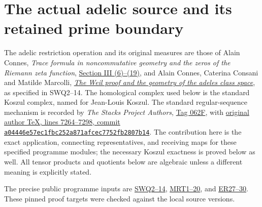 \section{The actual adelic source and its retained prime boundary}
\label{sec:independent-adelic-coinvariant-bridge}

The adelic restriction operation and its original measures are those of
Alain Connes, \emph{Trace formula in noncommutative geometry and the zeros
of the Riemann zeta function},
\href{https://arxiv.org/abs/math/9811068v1}{Section III (6)--(19)},
and Alain Connes, Caterina Consani and Matilde Marcolli,
\href{https://arxiv.org/abs/math/0703392v1}{\emph{The Weil proof and the
geometry of the adeles class space}}, as specified in SWQ2--14.
The homological complex used below is the standard Koszul complex,
named for Jean-Louis Koszul. The standard regular-sequence mechanism is
recorded by \emph{The Stacks Project Authors},
\href{https://stacks.math.columbia.edu/tag/062F}{Tag 062F}, with
\href{https://github.com/stacks/stacks-project/blob/a04446e57ec1fbc252a871afcec7752fb2807b14/more-algebra.tex#L7264}{original
author TeX, lines 7264--7298, commit
\texttt{a04446e57ec1fbc252a871afcec7752fb2807b14}}.
The contribution here is the exact application, connecting representatives,
and receiving maps for these specified programme modules; the necessary
Koszul exactness is proved below as well. All tensor products and
quotients below are algebraic unless a different meaning is explicitly
stated.

The precise public programme inputs are
\href{https://github.com/KokunoYumeto/zeta-function-research-reader/blob/acd7016b8232a56f31ae3e69fb800571e8789080/workbenches/splitzero-tandem/continuations/20260923-retained-source-readers/original-zeta-full-boundary/CC_WEIL_BOUNDARY_READER.tex#L927}{SWQ2--14},
\href{https://github.com/KokunoYumeto/zeta-function-research-reader/blob/acd7016b8232a56f31ae3e69fb800571e8789080/workbenches/splitzero-tandem/continuations/20260923-retained-source-readers/original-zeta-full-support/MASS_THETA_PRIME_RECEIVER.tex#L12}{MRT1--20}, and
\href{https://github.com/KokunoYumeto/zeta-function-research-reader/blob/acd7016b8232a56f31ae3e69fb800571e8789080/workbenches/splitzero-tandem/continuations/20260923-retained-source-readers/endpoint-resonance/ENDPOINT_RESONANCE_AND_PRIME_CLASS.tex#L430}{ER27--30}.
These pinned proof targets were checked against the local source versions.

